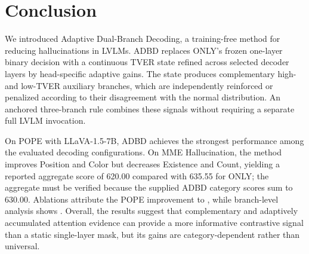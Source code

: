 \section{Conclusion}
\label{sec:conclusion}

We introduced Adaptive Dual-Branch Decoding, a training-free method for reducing hallucinations in LVLMs. ADBD replaces ONLY's frozen one-layer binary decision with a continuous TVER state refined across selected decoder layers by head-specific adaptive gains. The state produces complementary high- and low-TVER auxiliary branches, which are independently reinforced or penalized according to their disagreement with the normal distribution. An anchored three-branch rule combines these signals without requiring a separate full LVLM invocation.

On POPE with LLaVA-1.5-7B, ADBD achieves the strongest performance among the evaluated decoding configurations.  On MME Hallucination, the method improves Position and Color but decreases Existence and Count, yielding a reported aggregate score of 620.00 compared with 635.55 for ONLY; the aggregate must be verified because the supplied ADBD category scores sum to 630.00. Ablations attribute the POPE improvement to , while branch-level analysis shows . Overall, the results suggest that complementary and adaptively accumulated attention evidence can provide a more informative contrastive signal than a static single-layer mask, but its gains are category-dependent rather than universal.
